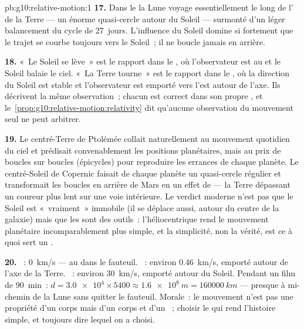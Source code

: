 \begin{solution}{pb:g10:relative-motion:1}
\textbf{17.} Dans le  la Lune voyage
essentiellement le long de l' de la Terre --- un
énorme quasi-cercle autour du Soleil --- surmonté d'un léger
balancement du cycle de \qty{27}{jours}. L'influence du Soleil domine
si fortement que le trajet se courbe toujours vers le Soleil~; il ne
boucle jamais en arrière.

\textbf{18.} «~Le Soleil se lève~» est le rapport dans le
, où l'observateur est au
 et le Soleil balaie le ciel. «~La Terre tourne~» est
le rapport dans le , où la direction
du Soleil est stable et l'observateur est emporté vers l'est autour
de l'axe. Ils décrivent la même observation~; chacun est correct dans
son propre , et le~\cref{prop:g10:relative-motion:relativity}
dit qu'aucune observation du mouvement seul ne peut arbitrer.

\textbf{19.} Le  centré-Terre de Ptolémée collait
naturellement au mouvement quotidien du ciel et prédisait
convenablement les positions planétaires, mais au prix de boucles sur
boucles (épicycles) pour reproduire les errances de chaque planète. Le
 centré-Soleil de Copernic faisait de chaque planète un
quasi-cercle régulier et transformait les boucles en arrière de Mars
en un effet de  --- la Terre dépassant un coureur plus lent
sur une voie intérieure. Le verdict moderne n'est pas que le Soleil
est «~vraiment~» immobile (il se déplace aussi, autour du centre de la
galaxie) mais que les  sont des outils~: l'héliocentrique
rend le mouvement planétaire incomparablement plus simple, et la
simplicité, non la vérité, est ce à quoi sert un .

\textbf{20.} ~: \qty{0}{km/s} --- au
 dans le fauteuil.
~: environ \qty{0.46}{km/s},
emporté autour de l'axe de la Terre.
~: environ \qty{30}{km/s},
emporté autour du Soleil. Pendant un film de \qty{90}{min}~:
$d = \num{3.0e4} \times 5400 \approx \qty{1.6e8}{m} =
\qty{160000}{km}$ --- presque à mi-chemin de la Lune sans quitter le
fauteuil. Morale~: le mouvement n'est pas une propriété d'un corps
mais d'un corps et d'un ~; choisir le  qui
rend l'histoire simple, et toujours dire lequel on a choisi.
\end{solution}
